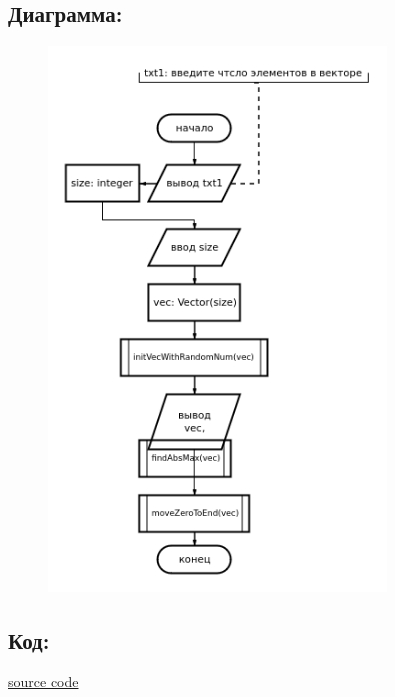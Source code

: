 \documentclass[14pt,a4paper]{article}
\begin{document}
\subsection{Диаграмма:}
\begin{figure}[H]
  \centering
  \includegraphics[width=0.8\textwidth]{data/diagram18_1.png}
\end{figure}
\subsection{Код:}

\href{https://raw.githubusercontent.com/John1400800/stuff/refs/heads/main/c_learning/home_works/task18_1.cpp}{source code}
\end{document}
